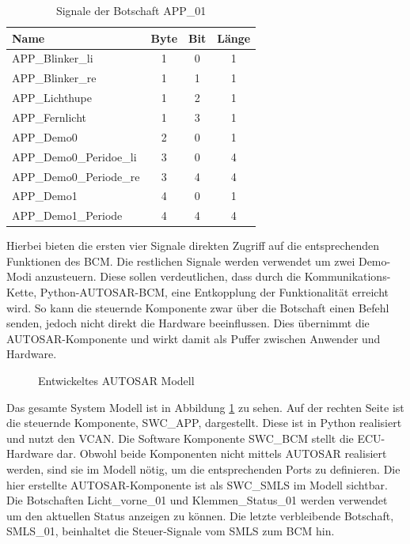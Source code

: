 \documentclass[
  a4paper,					    %
  twoside,
  DIV=calc,     				%
  bibliography=totoc,
  cleardoublepage=empty,
  ngerman,     					%
  final       					%
]{scrbook}
\begin{document}
\begin{table}[ht]
    \centering
    \begin{tabular}[h]{l c c c}
        Name & Byte & Bit & Länge\\
        \toprule
        APP\_Blinker\_li        & 1 &  0  & 1\\
        APP\_Blinker\_re        & 1 &  1  & 1\\
        APP\_Lichthupe          & 1 &  2  & 1\\
        APP\_Fernlicht          & 1 &  3  & 1\\
        APP\_Demo0              & 2 &  0  & 1\\
        APP\_Demo0\_Peridoe\_li & 3 &  0  & 4\\
        APP\_Demo0\_Periode\_re & 3 &  4  & 4\\
        APP\_Demo1              & 4 &  0  & 1\\
        APP\_Demo1\_Periode     & 4 &  4  & 4\\
        \bottomrule
    \end{tabular}
    \caption{Signale der Botschaft APP\_01}
    \label{tab:App_Botschaft}
\end{table}

Hierbei bieten die ersten vier Signale direkten Zugriff auf die entsprechenden Funktionen des BCM. Die restlichen Signale werden verwendet um zwei Demo-Modi anzusteuern. Diese sollen verdeutlichen, dass durch die Kommunikations-Kette, Python-AUTOSAR-BCM, eine Entkopplung der Funktionalität erreicht wird. So kann die steuernde Komponente zwar über die Botschaft einen Befehl senden, jedoch nicht direkt die Hardware beeinflussen. Dies übernimmt die AUTOSAR-Komponente und wirkt damit als Puffer zwischen Anwender und Hardware.

\begin{figure}[ht]
    \centering
    \resizebox{\linewidth}{!}{}
    \caption{Entwickeltes AUTOSAR Modell}
    \label{fig:smls_modell}
\end{figure}

Das gesamte System Modell ist in Abbildung \ref{fig:smls_modell} zu sehen. Auf der rechten Seite ist die steuernde Komponente, SWC\_APP, dargestellt. Diese ist in Python realisiert und nutzt den VCAN. Die Software Komponente SWC\_BCM stellt die ECU-Hardware dar. Obwohl beide Komponenten nicht mittels AUTOSAR realisiert werden, sind sie im Modell nötig, um die entsprechenden Ports zu definieren. Die hier erstellte AUTOSAR-Komponente ist als SWC\_SMLS im Modell sichtbar. Die Botschaften Licht\_vorne\_01 und Klemmen\_Status\_01 werden verwendet um den aktuellen Status anzeigen zu können. Die letzte verbleibende Botschaft, SMLS\_01, beinhaltet die Steuer-Signale vom SMLS zum BCM hin.
\end{document}
